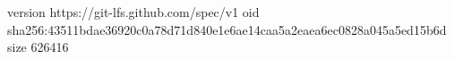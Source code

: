 version https://git-lfs.github.com/spec/v1
oid sha256:43511bdae36920c0a78d71d840e1e6ae14caa5a2eaea6ec0828a045a5ed15b6d
size 626416
